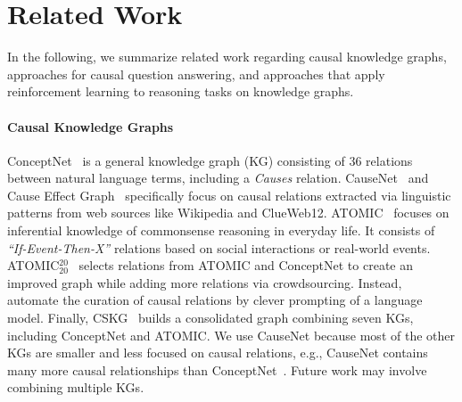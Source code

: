 \section{Related Work}
\label{sec:related-work}

In the following, we summarize related work regarding causal knowledge 
graphs, approaches for causal question answering, and approaches that apply reinforcement learning to reasoning tasks on knowledge graphs.

\paragraph{Causal Knowledge Graphs}
ConceptNet~\cite{Speer2017ConceptNet} is a general knowledge graph (KG) consisting of 36 relations between natural language terms, including a \textit{Causes} relation. CauseNet~\cite{Heindorf2020Causenet} and Cause Effect Graph~\cite{Li2020CauseEffectGraph} specifically focus on causal relations extracted via linguistic patterns from web sources like Wikipedia and ClueWeb12. ATOMIC~\cite{Sap2019ATOMIC} focuses on inferential knowledge of commonsense reasoning in everyday life. It consists of \textit{``If-Event-Then-X''} relations based on social interactions or real-world events. ATOMIC$^{20}_{20}$~\cite{Hwang2021COMET} selects relations from ATOMIC and ConceptNet to create an improved graph while adding more relations via crowdsourcing. Instead, \citet{West2022Symbolic} automate the curation of causal relations by clever prompting of a language model. Finally, CSKG~\cite{Ilievski2021CSKG} builds a consolidated graph combining seven KGs, including ConceptNet and ATOMIC. We use CauseNet because most of the other KGs are smaller and less focused on causal relations, e.g., CauseNet contains many more causal relationships than ConceptNet~\cite{Heindorf2020Causenet}. Future work may involve combining multiple KGs.


